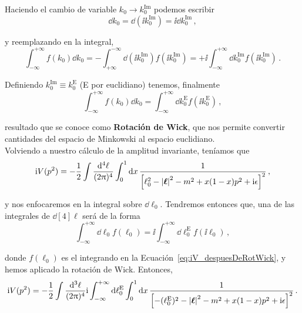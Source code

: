 Haciendo el cambio de variable $k_0 \longrightarrow k_0^\text{Im}$ podemos escribir
%
\begin{equation}
	\dd{k_0} = \dd{(\ii k_0^\text{Im})} = \ii \dd{k_0^\text{Im}} \,,
\end{equation}

\noindent y reemplazando en la integral,
%
\begin{equation}
	\int_{-\infty}^{+\infty} f(k_0) \dd{k_0} = - \int_{+\infty}^{-\infty} \dd{(\ii k_0^\text{Im})} f(\ii k_0^\text{Im}) = + \ii \int_{-\infty}^{+\infty} \dd{k_0^\text{Im}} f(\ii k_0^\text{Im}) \,.
\end{equation}

Definiendo $k_0^\text{Im} \equiv k_0^\text{E}$ (E por euclidiano) tenemos, finalmente
%
\begin{equation}
	\boxed{\int_{-\infty}^{+\infty} f(k_0) \dd{k_0}  = \int_{-\infty}^{+\infty} \dd{k_0^\text{E}} f(\ii k_0^\text{E})} \,,
	\label{eq:rotWick}
\end{equation}

\noindent resultado que se conoce como \textbf{Rotación de Wick}, que nos permite convertir cantidades del espacio de Minkowski al espacio euclidiano.\\


Volviendo a nuestro cálculo de la amplitud invariante, teníamos que
%
\begin{equation}
	\mathrm{i} V(p^2) = -\frac{1}{2} \int \frac{\dd[4]{\ell}}{(2 \uppi)^4} \int_0^1 \dd{x} \frac{1}{\qty[\ell_0^2 - \abs{\vb*{\ell}}^2 - m^2 + x(1 - x)p^2 + \mathrm{i}\epsilon]^2} \,,
\label{eq:iV_despuesDeRotWick}
\end{equation}

\noindent y nos enfocaremos en la integral sobre $\dd{\ell_0}$. Tendremos entonces que, una de las integrales de $\dd[4]\ell$ será de la forma
%
\begin{equation}
	\int_{-\infty}^{+\infty} \dd{\ell_0} f(\ell_0) = \ii \int_{-\infty}^{+\infty} \dd{\ell_0^\text{E}} f(\ii \ell_0) \,,
\end{equation}

\noindent donde $f(\ell_0)$ es el integrando en la Ecuación~\eqref{eq:iV_despuesDeRotWick}, y hemos aplicado la rotación de Wick. Entonces,
%
\begin{equation}
	\mathrm{i} V(p^2) = -\frac{1}{2} \int \frac{\dd[3]{\ell}}{(2\uppi)^4} \mathrm{i} \int_{-\infty}^{+\infty} \dd{\ell_0^\text{E}} \int_0^1 \dd{x} \frac{1}{\qty[-(\ell_0^\text{E})^2 - \abs{\vb*{\ell}}^2 - m^2 + x(1 - x)p^2 + \mathrm{i}\epsilon]^2} \,.
\end{equation}

